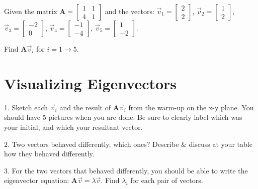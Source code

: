 \documentclass{article}
\begin{document}
\begin{flushleft}
Given the matrix 
$\textbf{A}=
\begin{bmatrix} 
1 & 1 \\ 4&1 
\end{bmatrix}$
 and the vectors: 
$\vec{v}_1=\begin{bmatrix} 2 \\ 2 \end{bmatrix}$, 
$\vec{v}_2=\begin{bmatrix} 1 \\ 2 \end{bmatrix}$,
$\vec{v}_3=\begin{bmatrix} -2 \\ 0 \end{bmatrix}$, 
$\vec{v}_4=\begin{bmatrix} -1 \\ -4 \end{bmatrix}$, 
$\vec{v}_5=\begin{bmatrix} 1 \\ -2 \end{bmatrix}$.

\vspace{0.1in}

Find $\textbf{A}\vec{v}_i$ for $i=1\rightarrow 5$. 

\vspace{2in}

\newpage

\section*{Visualizing Eigenvectors}

1. Sketch each $\vec{v}_i$ and the result of $\textbf{A}\vec{v}_i$ from the warm-up on the x-y plane. You should have 5 pictures when you are done. Be sure to clearly label which was your initial, and which your resultant vector. 

\vspace{4in}

2. Two vectors behaved differently, which ones? Describe \& discuss at your table how they behaved differently.

\vspace{1in}

3. For the two vectors that behaved differently, you should be able to write the eigenvector equation: $\textbf{A}\vec{v}=\lambda \vec{v}$. Find $\lambda_i$ for each pair of vectors.

\vspace{.75in}


\end{flushleft}
\end{document}
